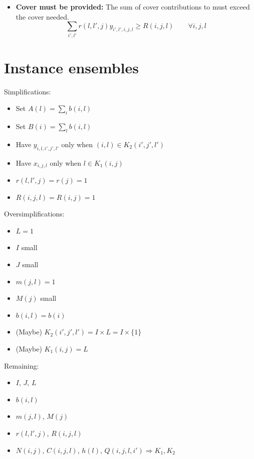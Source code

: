 \documentclass{article}
\begin{document}
\begin{itemize}
\item
\textbf{Cover must be provided:}
The sum of cover contributions to must exceed the cover needed.
\begin{equation} \label{eqn:constraint_cover}
    \sum_{i', l'} r(l, l', j) y_{i', l', i, j, l} \geq R(i, j, l) \qquad \forall i, j, l
\end{equation}
\end{itemize}

\section{Instance ensembles}
Simplifications:
\begin{itemize}
    \item Set $A(l) = \sum_{i} b(i, l)$
    \item Set $B(i) = \sum_{l} b(i, l)$
    \item Have $y_{i,l,i',j',l'}$ only when $(i, l) \in K_2(i', j', l')$
    \item Have $x_{i, j, l}$ only when $l \in K_1(i, j)$
    \item $r(l, l', j) = r(j) = 1$
    \item $R(i, j, l) = R(i, j) = 1$
\end{itemize}

\noindent
Oversimplifications:
\begin{itemize}
\item $L = 1$
\item $I$ small
\item $J$ small
\item $m(j, l) = 1$
\item $M(j)$ small 
\item $b(i, l) = b(i)$
\item (Maybe) $K_2(i', j', l') = I \times L = I \times \{1\}$
\item (Maybe) $K_1(i, j) = L$
\end{itemize}

\noindent
Remaining:
\begin{itemize}
\item $I$, $J$, $L$
\item $b(i, l)$
\item $m(j, l)$, $M(j)$
\item $r(l, l', j)$, $R(i, j, l)$
\item $N(i, j)$, $C(i, j, l)$, $h(l)$, $Q(i, j, l, i') \Rightarrow K_1, K_2$
\end{itemize}
\end{document}
